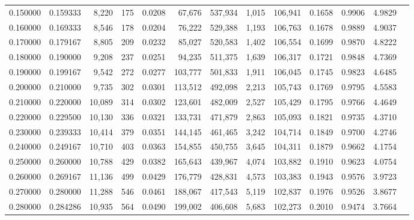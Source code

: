 \begin{tabular}{rrrrrrrrrrrrr}
0.150000 & 0.159333 &  8,220 &   175 &                                     0.0208 &  67,676 & 537,934 &   1,015 & 106,941 & 0.1658 & 0.9906 & 4.9829 \\
0.160000 & 0.169333 &  8,546 &   178 &                                     0.0204 &  76,222 & 529,388 &   1,193 & 106,763 & 0.1678 & 0.9889 & 4.9037 \\
0.170000 & 0.179167 &  8,805 &   209 &                                     0.0232 &  85,027 & 520,583 &   1,402 & 106,554 & 0.1699 & 0.9870 & 4.8222 \\
0.180000 & 0.190000 &  9,208 &   237 &                                     0.0251 &  94,235 & 511,375 &   1,639 & 106,317 & 0.1721 & 0.9848 & 4.7369 \\
0.190000 & 0.199167 &  9,542 &   272 &                                     0.0277 & 103,777 & 501,833 &   1,911 & 106,045 & 0.1745 & 0.9823 & 4.6485 \\
0.200000 & 0.210000 &  9,735 &   302 &                                     0.0301 & 113,512 & 492,098 &   2,213 & 105,743 & 0.1769 & 0.9795 & 4.5583 \\
0.210000 & 0.220000 & 10,089 &   314 &                                     0.0302 & 123,601 & 482,009 &   2,527 & 105,429 & 0.1795 & 0.9766 & 4.4649 \\
0.220000 & 0.229500 & 10,130 &   336 &                                     0.0321 & 133,731 & 471,879 &   2,863 & 105,093 & 0.1821 & 0.9735 & 4.3710 \\
0.230000 & 0.239333 & 10,414 &   379 &                                     0.0351 & 144,145 & 461,465 &   3,242 & 104,714 & 0.1849 & 0.9700 & 4.2746 \\
0.240000 & 0.249167 & 10,710 &   403 &                                     0.0363 & 154,855 & 450,755 &   3,645 & 104,311 & 0.1879 & 0.9662 & 4.1754 \\
0.250000 & 0.260000 & 10,788 &   429 &                                     0.0382 & 165,643 & 439,967 &   4,074 & 103,882 & 0.1910 & 0.9623 & 4.0754 \\
0.260000 & 0.269167 & 11,136 &   499 &                                     0.0429 & 176,779 & 428,831 &   4,573 & 103,383 & 0.1943 & 0.9576 & 3.9723 \\
0.270000 & 0.280000 & 11,288 &   546 &                                     0.0461 & 188,067 & 417,543 &   5,119 & 102,837 & 0.1976 & 0.9526 & 3.8677 \\
0.280000 & 0.284286 & 10,935 &   564 &                                     0.0490 & 199,002 & 406,608 &   5,683 & 102,273 & 0.2010 & 0.9474 & 3.7664 \\

\end{tabular}

